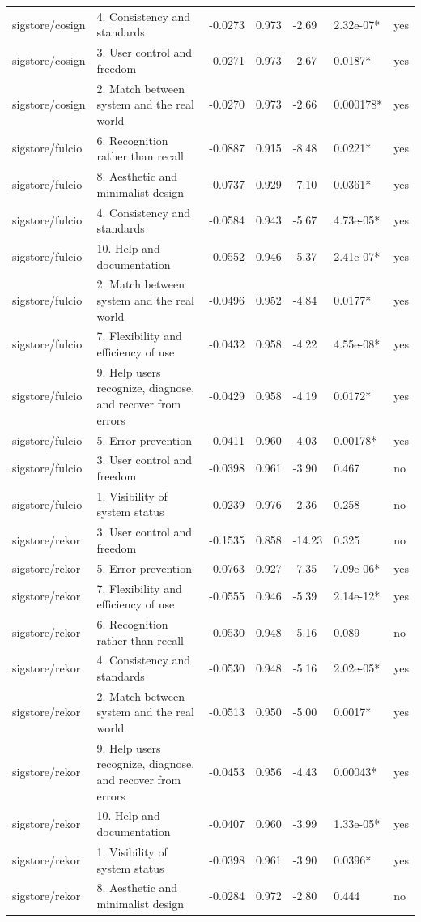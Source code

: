 \begin{table}[t]
\begin{tabular}{lllllll}
sigstore/cosign & 4. Consistency and standards & -0.0273 & 0.973 & -2.69 & 2.32e-07* & yes \\
sigstore/cosign & 3. User control and freedom & -0.0271 & 0.973 & -2.67 & 0.0187* & yes \\
sigstore/cosign & 2. Match between system and the real world & -0.0270 & 0.973 & -2.66 & 0.000178* & yes \\
sigstore/fulcio & 6. Recognition rather than recall & -0.0887 & 0.915 & -8.48 & 0.0221* & yes \\
sigstore/fulcio & 8. Aesthetic and minimalist design & -0.0737 & 0.929 & -7.10 & 0.0361* & yes \\
sigstore/fulcio & 4. Consistency and standards & -0.0584 & 0.943 & -5.67 & 4.73e-05* & yes \\
sigstore/fulcio & 10. Help and documentation & -0.0552 & 0.946 & -5.37 & 2.41e-07* & yes \\
sigstore/fulcio & 2. Match between system and the real world & -0.0496 & 0.952 & -4.84 & 0.0177* & yes \\
sigstore/fulcio & 7. Flexibility and efficiency of use & -0.0432 & 0.958 & -4.22 & 4.55e-08* & yes \\
sigstore/fulcio & 9. Help users recognize, diagnose, and recover from errors & -0.0429 & 0.958 & -4.19 & 0.0172* & yes \\
sigstore/fulcio & 5. Error prevention & -0.0411 & 0.960 & -4.03 & 0.00178* & yes \\
sigstore/fulcio & 3. User control and freedom & -0.0398 & 0.961 & -3.90 & 0.467 & no \\
sigstore/fulcio & 1. Visibility of system status & -0.0239 & 0.976 & -2.36 & 0.258 & no \\
sigstore/rekor & 3. User control and freedom & -0.1535 & 0.858 & -14.23 & 0.325 & no \\
sigstore/rekor & 5. Error prevention & -0.0763 & 0.927 & -7.35 & 7.09e-06* & yes \\
sigstore/rekor & 7. Flexibility and efficiency of use & -0.0555 & 0.946 & -5.39 & 2.14e-12* & yes \\
sigstore/rekor & 6. Recognition rather than recall & -0.0530 & 0.948 & -5.16 & 0.089 & no \\
sigstore/rekor & 4. Consistency and standards & -0.0530 & 0.948 & -5.16 & 2.02e-05* & yes \\
sigstore/rekor & 2. Match between system and the real world & -0.0513 & 0.950 & -5.00 & 0.0017* & yes \\
sigstore/rekor & 9. Help users recognize, diagnose, and recover from errors & -0.0453 & 0.956 & -4.43 & 0.00043* & yes \\
sigstore/rekor & 10. Help and documentation & -0.0407 & 0.960 & -3.99 & 1.33e-05* & yes \\
sigstore/rekor & 1. Visibility of system status & -0.0398 & 0.961 & -3.90 & 0.0396* & yes \\
sigstore/rekor & 8. Aesthetic and minimalist design & -0.0284 & 0.972 & -2.80 & 0.444 & no \\
\hline
\end{tabular}
\end{table}
